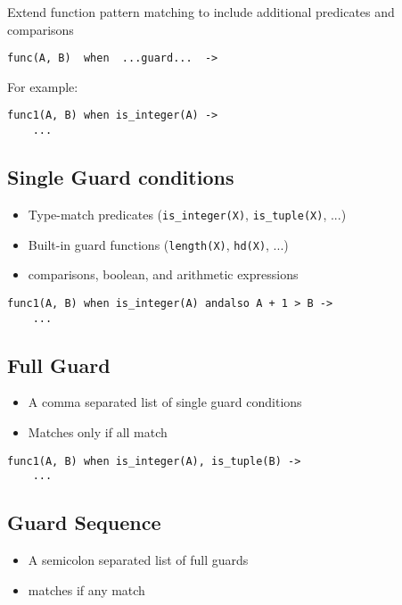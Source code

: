 \documentclass[12pt]{article}
\begin{document}
Extend function pattern matching to include additional predicates and
comparisons

\begin{verbatim}
func(A, B)  when  ...guard...  -> 
\end{verbatim}

For example:

\begin{verbatim}
func1(A, B) when is_integer(A) ->
    ...
\end{verbatim}

\subsection{Single Guard conditions}
\begin{itemize}
\item Type-match predicates (\verb+is_integer(X)+, \verb+is_tuple(X)+, ...)
\item Built-in guard functions (\verb+length(X)+, \verb+hd(X)+, ...)
\item comparisons, boolean, and arithmetic expressions
\end{itemize}

\begin{verbatim}
func1(A, B) when is_integer(A) andalso A + 1 > B ->
    ...
\end{verbatim}

\subsection{Full Guard}

\begin{itemize}
\item A comma separated list of single guard conditions
\item Matches only if all match
\end{itemize}

\begin{verbatim}
func1(A, B) when is_integer(A), is_tuple(B) ->
    ...
\end{verbatim}

\subsection{Guard Sequence}

\begin{itemize}
\item A semicolon separated list of full guards
\item matches if any match
\end{itemize}
\end{document}
